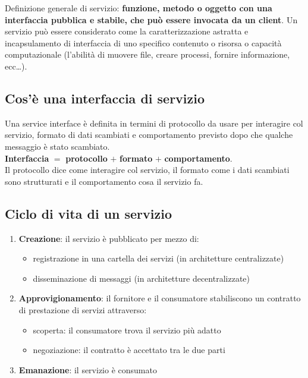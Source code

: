 Definizione generale di servizio:
\textbf{funzione, metodo o oggetto con una interfaccia pubblica e stabile, che può essere invocata da un client}. Un servizio può essere considerato come la caratterizzazione astratta e incapsulamento di interfaccia di uno specifico contenuto o risorsa o capacità computazionale (l'abilità di muovere file, creare processi, fornire informazione, ecc\dots).

\subsection{Cos'è una interfaccia di servizio}
Una service interface è definita in termini di protocollo da usare per interagire col servizio, formato di dati scambiati e comportamento previsto dopo che qualche messaggio è stato scambiato. \\

\textbf{Interfaccia} $=$ \textbf{protocollo} $+$ \textbf{formato} $+$ \textbf{comportamento}.\\

Il protocollo dice come interagire col servizio, il formato come i dati scambiati sono strutturati e il comportamento cosa il servizio fa. 

\subsection{Ciclo di vita di un servizio}
\begin{enumerate}
    \item \textbf{Creazione}: il servizio è pubblicato per mezzo di:
    \begin{itemize}
        \item registrazione in una cartella dei servizi (in architetture centralizzate)
        \item disseminazione di messaggi (in architetture decentralizzate)
    \end{itemize}
    \item \textbf{Approvigionamento}: il fornitore e il consumatore stabiliscono un contratto di prestazione di servizi attraverso:
    \begin{itemize}
        \item scoperta: il consumatore trova il servizio più adatto
        \item negoziazione: il contratto è accettato tra le due parti
    \end{itemize}
    \item \textbf{Emanazione}: il servizio è consumato
\end{enumerate}

